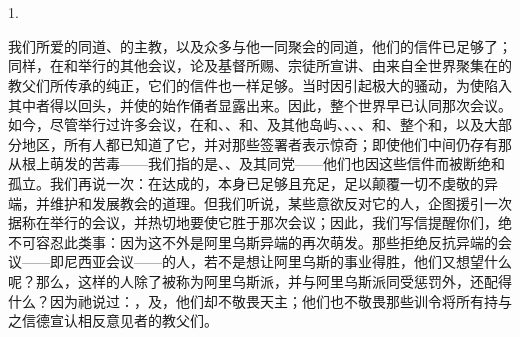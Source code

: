 
\chapter{}


\par

\par

1. \par

我们所爱的同道、的主教，以及众多与他一同聚会的同道，他们的信件已足够了；同样，在和举行的其他会议，论及基督所赐、宗徒所宣讲、由来自全世界聚集在的教父们所传承的纯正，它们的信件也一样足够。当时因引起极大的骚动，为使陷入其中者得以回头，并使的始作俑者显露出来。因此，整个世界早已认同那次会议。如今，尽管举行过许多会议，在和、、和、及其他岛屿、、、、和、整个和，以及大部分地区，所有人都已知道了它，并对那些签署者表示惊奇；即使他们中间仍存有那从根上萌发的苦毒——我们指的是、、及其同党——他们也因这些信件而被断绝和孤立。我们再说一次：在达成的，本身已足够且充足，足以颠覆一切不虔敬的异端，并维护和发展教会的道理。但我们听说，某些意欲反对它的人，企图援引一次据称在举行的会议，并热切地要使它胜于那次会议；因此，我们写信提醒你们，绝不可容忍此类事：因为这不外是阿里乌斯异端的再次萌发。那些拒绝反抗异端的会议——即尼西亚会议——的人，若不是想让阿里乌斯的事业得胜，他们又想望什么呢？那么，这样的人除了被称为阿里乌斯派，并与阿里乌斯派同受惩罚外，还配得什么？因为祂说过：，及，他们却不敬畏天主；他们也不敬畏那些训令将所有持与之信德宣认相反意见者的教父们。\par

